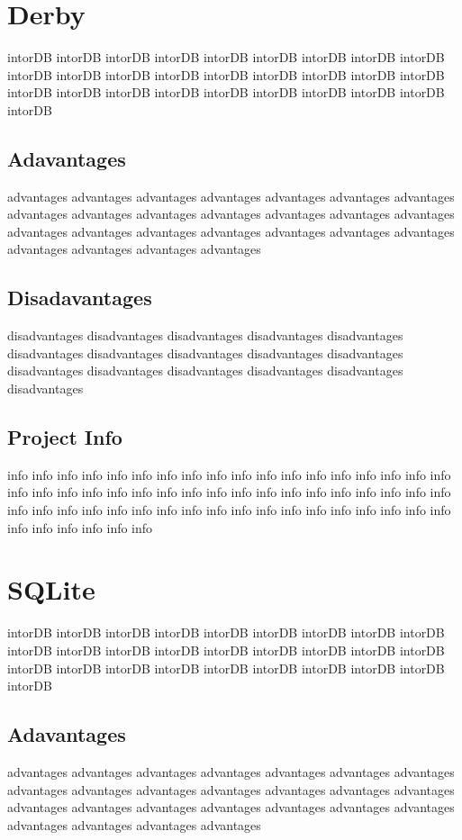 		\section{Derby}
		intorDB intorDB intorDB intorDB intorDB intorDB intorDB 
		intorDB intorDB intorDB intorDB intorDB intorDB intorDB 
		intorDB intorDB intorDB intorDB intorDB intorDB intorDB 
		intorDB intorDB intorDB intorDB intorDB intorDB intorDB 
		
			\subsection{Adavantages}
			advantages advantages advantages advantages advantages 
			advantages advantages advantages advantages advantages 
			advantages advantages advantages advantages advantages 
			advantages advantages advantages advantages advantages 
			advantages advantages advantages advantages advantages 
			
			\subsection{Disadavantages}
			disadvantages disadvantages disadvantages disadvantages 
			disadvantages disadvantages disadvantages disadvantages 
			disadvantages disadvantages disadvantages disadvantages 
			disadvantages disadvantages disadvantages disadvantages 
			
			\subsection{Project Info}
			info info info info info info info info info info info info 
			info info info info info info info info info info info info 
			info info info info info info info info info info info info 
			info info info info info info info info info info info info 
			info info info info info info info info info info info info
		
		\section{SQLite}
		intorDB intorDB intorDB intorDB intorDB intorDB intorDB 
		intorDB intorDB intorDB intorDB intorDB intorDB intorDB 
		intorDB intorDB intorDB intorDB intorDB intorDB intorDB 
		intorDB intorDB intorDB intorDB intorDB intorDB intorDB 
		
			\subsection{Adavantages}
			advantages advantages advantages advantages advantages 
			advantages advantages advantages advantages advantages 
			advantages advantages advantages advantages advantages 
			advantages advantages advantages advantages advantages 
			advantages advantages advantages advantages advantages 
			
